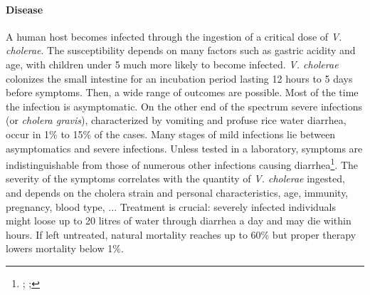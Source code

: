 \paragraph{Disease} A human host becomes infected through the ingestion of a critical dose of \emph{V. cholerae}. The susceptibility depends on many factors such as gastric acidity and age, with children under 5 much more likely to become infected\cite{Sack:Cholera:2004}. \textit{V. cholerae} colonizes the small intestine for an incubation period lasting 12 hours to 5 days\cite{Azman:IncubationPeriodCholera:2013} before symptoms. Then, a wide range of outcomes are possible. Most of the time the infection is asymptomatic. On the other end of the spectrum severe infections (or \emph{cholera gravis}), characterized by vomiting and profuse rice water diarrhea, occur in 1\% to 15\% of the cases. Many stages of mild infections lie between asymptomatics and severe infections. Unless tested in a laboratory, symptoms are indistinguishable from those of numerous other infections causing diarrhea\footnote{;  ; }.  The severity of the symptoms correlates with the quantity of \textit{V. cholerae} ingested\cite{Brouwer:DoseresponseRelationshipsEnvironmentally:2017}, and depends on the cholera strain and personal characteristics, age, immunity, pregnancy, blood type\cite{WHO:CholeraVaccinesWHO:2017,Azman:IncubationPeriodCholera:2013}, ...%
 Treatment is crucial: severely infected individuals might loose up to 20 litres of water through diarrhea a day and may die within hours. If left untreated, natural mortality reaches up to 60\% but proper therapy lowers mortality below 1\%\cite{Luquero:MortalityRatesCholera:2016}.

